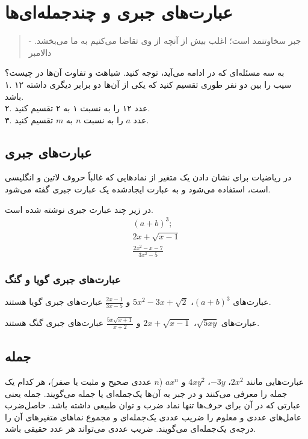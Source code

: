 \chapter{عبارت‌های جبری و چندجمله‌ای‌ها}
\thispagestyle{empty}

\begin{quote}
	{\lotus
		جبر سخاوتنمد است؛ اغلب بیش از آنچه از وی تقاضا می‌کنیم به ما می‌بخشد. \quad - دالامبر%
	}
\end{quote}

به سه مسئله‌ای که در ادامه می‌آید، توجه کنید. شباهت و تفاوت آن‌ها در چیست؟ \\
۱. ۱۲ سیب را بین دو نفر طوری تقسیم کنید که یکی از آن‌ها دو برابر دیگری داشته باشد. \\
۲. عدد ۱۲ را به نسبت ۱ به ۲ تقسیم کنید. \\
۳. عدد $a$ را به نسبت $n$ به $m$ تقسیم کنید.

\section{عبارت‌های جبری}
در ریاضیات برای نشان دادن یک متغیر از نمادهایی که غالباً حروف لاتین و انگلیسی است، استفاده می‌شود و به عبارت ایجادشده یک عبارت جبری گفته می‌شود.
\begin{example}
	در زیر چند عبارت جبری نوشته شده است.
	\begin{gather*}
		(a+b)^3 ; \\
		2x + \sqrt{x-1} \\
		\frac{2x^2-x-7}{3x^2-5}
	\end{gather*}
\end{example}

\subsection{عبارت‌های جبری گویا و گنگ}
\begin{example}
	عبارت‌های
	$(a+b)^3$، $5x^2-3x+\sqrt{2}$ و $\frac{2x-1}{3x-5}$
	عبارت‌های جبری گویا هستند.
\end{example}

\begin{example}
	عبارت‌های
	$\sqrt{5xy}$، $2x+\sqrt{x-1}$ و $\frac{5x\sqrt{x+1}}{x+2}$
	عبارت‌های جبری گنگ هستند.
\end{example}

\section{جمله}
عبارت‌هایی مانند
$2x^2$، $-3y$، $4xy^2$ و $ax^n$ ($n$ عددی صحیح و مثبت یا صفر)،
هر کدام یک جمله را معرفی می‌کنند و در جبر به آن‌ها یک‌جمله‌ای یا جمله می‌گویند. جمله یعنی عبارتی که در آن برای حرف‌ها تنها نماد ضرب و توان طبیعی داشته باشد. حاصل‌ضرب عامل‌های عددی و معلوم را ضریب عددی یک‌جمله‌ای و مجموع نماهای متغیرهای آن را درجه‌ی یک‌جمله‌ای می‌گویند. ضریب عددی می‌تواند هر عدد حقیقی باشد. 

